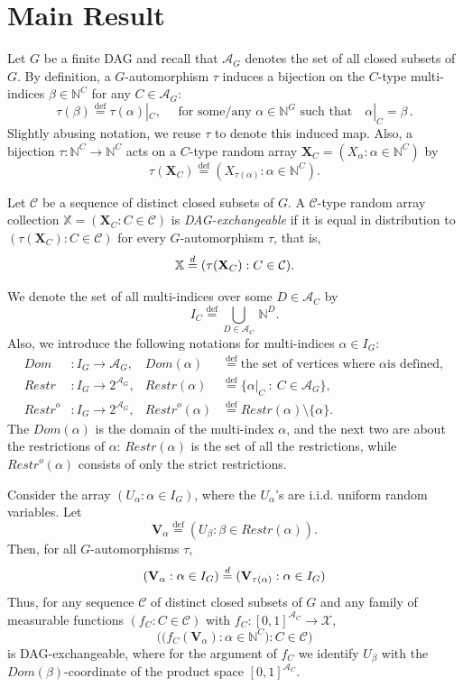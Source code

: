\documentclass[AHL,Unicode,longabstracts,published]{cedram}
\newcommand{\alf}{\alpha}%
\newcommand*\bb{\beta}
\newcommand*{\defeq}{\stackrel{\mathrm{def}}{=}}
\newcommand{\indices}[1]{\mathbb{N}^{#1}}
\newcommand{\res}[2]{#1|_{#2}}
\renewcommand{\d}{\buildrel{d}\over{=}}
\newcommand*\rstr{\mathit{Restr}}
\newcommand*\srstr{\mathit{Restr}^o}
\newcommand*\dom{\mathit{Dom}}
\newcommand*\X{\mathbb{X}}
\newcommand*\N{\mathbb{N}}
\renewcommand{\AA}{\mathcal{A}}
\newcommand*\CC{{\mathcal{C}}}
\newcommand*\XX{{\mathcal{X}}}
\newcommand*\bX{\mathbf{X}}
\newcommand*\N{\mathbb{N}}
\begin{document}
\section{Main Result}\label{sec:result}
Let $G$ be a finite DAG and recall that $\AA_G$ denotes the set of all closed subsets of $G$. By definition, a $G$-automorphism $\tau$ induces a bijection on the $C$-type multi-indices $\bb\in \indices C$ for any $C\in\AA_G$:
\[
\tau(\bb)
\defeq \res{\tau(\alf)}C,\quad \text{ for some/any }\alf \in \indices G\text{ such that}\quad\res \alf C=\bb\,.
\]
Slightly abusing notation, we reuse $\tau$ to denote this induced map. Also, a bijection $\tau\colon \indices C\to \indices C$ acts on a $C$-type random array $\bX_C = (X_\alf : \alf \in \indices C)$ by
\[
\tau(\bX_C)
\defeq {\left(X_{\tau(\alf)} : \alf \in \indices C\right)}.
\]


\begin{defi}
Let $\CC$ be a sequence of distinct closed subsets of $G$. A $\CC$-type random array collection $\X=(\bX_C : C \in \CC)$ is \emph{DAG-exchangeable} if it is equal in distribution to $(\tau(\bX_C) : C \in \CC)$ for every $G$-automorphism $\tau$, that is,
\[
\X \d (\tau(\bX_C) : C \in \CC).
\]
\end{defi}


We denote the set of all multi-indices over some $D \in \AA_C$ by
\[
I_C
\defeq \bigcup_{D \in \AA_C}\,\N^D.
\]
Also, we introduce the following notations for multi-indices $\alf \in I_G$:
\begin{align*}
\dom & \colon I_G \to \AA_G, &
\dom(\alf) &
\defeq \text{the set of vertices where }\alf \text{is defined},
\\
\rstr & \colon I_G \to 2^{\AA_G}, &
\rstr(\alf) &
\defeq \{\alf|_C~:~C \in \AA_G\},
\\
\srstr & \colon I_G \to 2^{\AA_G}, &
\srstr(\alf) &
\defeq \rstr(\alf) \setminus\{\alf\}.
\end{align*}
The $\dom(\alf)$ is the domain of the multi-index $\alf$, and the next two are about the restrictions of $\alf$: $\rstr(\alf)$ is the set of all the restrictions, while $\srstr(\alf)$ consists of only the strict restrictions.

Consider the array $(U_\alpha : \alpha \in I_G)$, where the $U_\alpha$'s are i.i.d. uniform random variables. Let
\[
\mathbf{V}_\alpha
\defeq (U_\beta : \beta \in \rstr(\alf)).
\]
Then, for all $G$-automorphisms $\tau$,
\[
(\mathbf{V}_\alpha : \alpha \in I_G)
\d (\mathbf{V}_{\tau(\alpha)} : \alpha \in I_G)
\]
Thus, for any sequence $\CC$ of distinct closed subsets of $G$ and any family of measurable functions $(f_C : C \in \CC)$ with $f_C : [0,1]^{\AA_C} \to \XX$,
\[
\Big(\big(f_C(\mathbf{V}_\alpha): \alpha \in \N^C\big) : C \in \CC \Big)
\]
is DAG-exchangeable, where for the argument of $f_C$ we identify $U_\beta$ with the $\dom(\bb)$-coordinate of the product space $[0,1]^{\AA_C}$.
\end{document}
